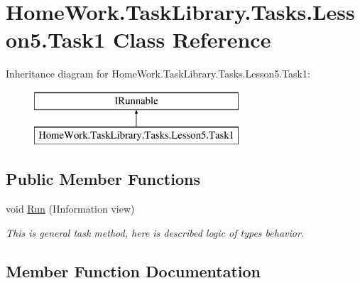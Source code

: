 \hypertarget{class_home_work_1_1_task_library_1_1_tasks_1_1_lesson5_1_1_task1}{}\section{Home\+Work.\+Task\+Library.\+Tasks.\+Lesson5.\+Task1 Class Reference}
\label{class_home_work_1_1_task_library_1_1_tasks_1_1_lesson5_1_1_task1}
Inheritance diagram for Home\+Work.\+Task\+Library.\+Tasks.\+Lesson5.\+Task1\+:\begin{figure}[H]
\begin{center}
\leavevmode
\includegraphics[height=2.000000cm]{class_home_work_1_1_task_library_1_1_tasks_1_1_lesson5_1_1_task1}
\end{center}
\end{figure}
\subsection*{Public Member Functions}
\begin{DoxyCompactItemize}
\item 
void \mbox{\hyperlink{class_home_work_1_1_task_library_1_1_tasks_1_1_lesson5_1_1_task1_a3af9c8581e148535974c6b5fb890a5d9}{Run}} (I\+Information view)
\begin{DoxyCompactList}\small\item\em This is general task method, here is described logic of types behavior. \end{DoxyCompactList}\end{DoxyCompactItemize}


\subsection{Member Function Documentation}
\mbox{\label{class_home_work_1_1_task_library_1_1_tasks_1_1_lesson5_1_1_task1_a3af9c8581e148535974c6b5fb890a5d9}} 

